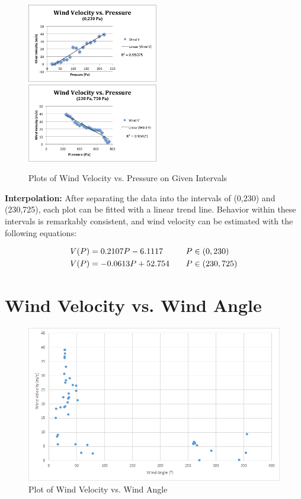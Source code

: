 \documentclass{article}
\begin{document}
\begin{figure}[H]
\centering
\includegraphics[width=2.25in]{LPANDA.png}\hfill \includegraphics[width=2.25in]{RPANDA.png}
\caption{Plots of Wind Velocity vs. Pressure on Given Intervals}
\end{figure}

\begin{flushleft}
\textbf{Interpolation:} After separating the data into the intervals of (0,230) and (230,725), each plot can be fitted with a linear trend line.  Behavior within these intervals is remarkably consistent, and wind velocity can be estimated with the following equations:
\end{flushleft}

\begin{align*}
\centering
    V(P) &= 0.2107P - 6.1117&& \text{\quad $P\in(0,230)$} \\
    V(P) &= -0.0613P + 52.754 && \text{\quad $P\in(230,725)$} \\
\end{align*}



\part{Wind Velocity vs. Wind Angle}
\label{alan}

\begin{figure}[H]
  \centering
  \includegraphics[width=\textwidth]{alan-data.png}
  \caption{Plot of Wind Velocity vs. Wind Angle}
\end{figure}
\end{document}
